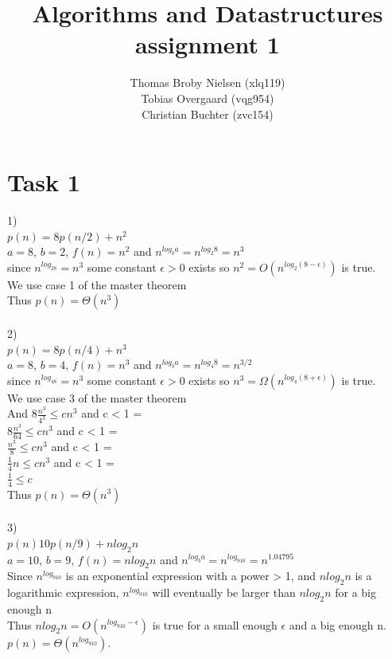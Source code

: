 \documentclass[12pt]{article}
\title{Algorithms and Datastructures assignment 1}
\author{Thomas Broby Nielsen (xlq119)\\ Tobias Overgaard (vqg954)\\ Christian Buchter (zvc154)}
\begin{document}
\maketitle

\tableofcontents

\pagebreak
\section{Task 1}
1)
\\
$
p(n)=8p(n/2)+n^{2}
$\\
$a=8$, $b=2$, $f(n)=n^{2}$ and $n^{log_{b}a}=n^{log_{2}8}=n^3$\\
since $n^{log_28}=n^3$ some constant $\epsilon > 0 $ exists so $n^2=O(n^{log_2(8-\epsilon)})$ is true.\\ We use case 1 of the master theorem\\
Thus $p(n)=\Theta (n^3)$\\
\\
2)
\\
$p(n)=8p(n/4)+n^{3}$\\
$a=8$, $b=4$, $f(n)=n^{3}$ and $n^{log_{b}a}=n^{log_{4}8}=n^{3/2}$\\
since $n^{log_48}=n^3$ some constant $\epsilon > 0$ exists so $n^3=\Omega(n^{log_4(8+\epsilon)})$  is true.\\ We use case 3 of the master theorem\\
And $8 \frac {n^3}{4^3} \leq cn^3$ and c < 1 =\\
 $8 \frac {n^3}{64} \leq cn^3$ and c < 1 =\\
 $ \frac {n^3}{8} \leq cn^3$ and c < 1 =\\
 $ \frac {1}{4}n \leq cn^3$ and c < 1 =\\
 $  \frac {1}{4} \leq c$\\
Thus $p(n)=\Theta(n^3)$\\
\\
3)
\\
$p(n)10p(n/9)+nlog_2n$
\\
$a=10$, $b=9$, $f(n)=nlog_2n$ and $n^{log_{b}a}=n^{log_910}=n^{1.04795}$
\\
Since $n^{log_910}$ is an exponential expression with a power > 1, and $n log_2 n$ is a logarithmic expression, $n^{log_910}$ will eventually be larger than $n log_2 n$ for a big enough n
\\
Thus $n log_2 n = O(n^{log_910-\epsilon})$ is true for a small enough $\epsilon$ and a big enough n.
$p(n)=\Theta (n^{log_910}).$
\newpage
\end{document}
